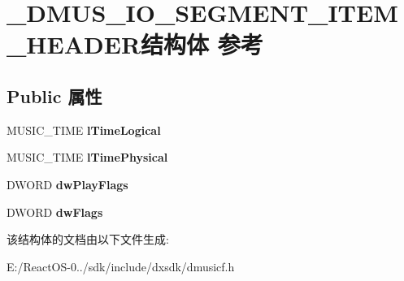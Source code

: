 \hypertarget{struct___d_m_u_s___i_o___s_e_g_m_e_n_t___i_t_e_m___h_e_a_d_e_r}{}\section{\+\_\+\+D\+M\+U\+S\+\_\+\+I\+O\+\_\+\+S\+E\+G\+M\+E\+N\+T\+\_\+\+I\+T\+E\+M\+\_\+\+H\+E\+A\+D\+E\+R结构体 参考}
\label{struct___d_m_u_s___i_o___s_e_g_m_e_n_t___i_t_e_m___h_e_a_d_e_r}
\subsection*{Public 属性}
\begin{DoxyCompactItemize}
\item 
\mbox{\label{struct___d_m_u_s___i_o___s_e_g_m_e_n_t___i_t_e_m___h_e_a_d_e_r_a2961446587a37aca9ad4f0a35103f570}} 
M\+U\+S\+I\+C\+\_\+\+T\+I\+ME {\bfseries l\+Time\+Logical}
\item 
\mbox{\label{struct___d_m_u_s___i_o___s_e_g_m_e_n_t___i_t_e_m___h_e_a_d_e_r_a80c1459f60bc9ba0adcedde3390d61b0}} 
M\+U\+S\+I\+C\+\_\+\+T\+I\+ME {\bfseries l\+Time\+Physical}
\item 
\mbox{\label{struct___d_m_u_s___i_o___s_e_g_m_e_n_t___i_t_e_m___h_e_a_d_e_r_a6f27e9e308ffe9267a6fd0e09422417b}} 
D\+W\+O\+RD {\bfseries dw\+Play\+Flags}
\item 
\mbox{\label{struct___d_m_u_s___i_o___s_e_g_m_e_n_t___i_t_e_m___h_e_a_d_e_r_a8740c3874907a9138315e3ea792da847}} 
D\+W\+O\+RD {\bfseries dw\+Flags}
\end{DoxyCompactItemize}


该结构体的文档由以下文件生成\+:\begin{DoxyCompactItemize}
\item 
E\+:/\+React\+O\+S-\/0../sdk/include/dxsdk/dmusicf.\+h\end{DoxyCompactItemize}
